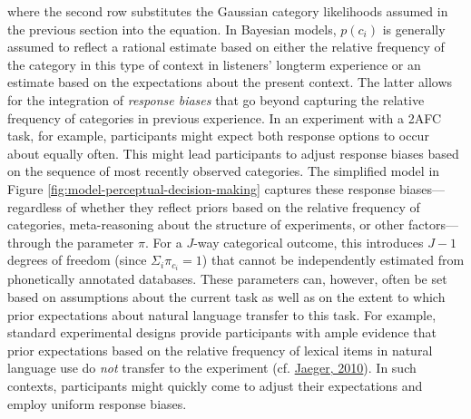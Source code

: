 \documentclass[
  11pt,
  man,floatsintext]{apa6}
\begin{document}
where the second row substitutes the Gaussian category likelihoods assumed in the previous section into the equation. In Bayesian models, \(p(c_i)\) is generally assumed to reflect a rational estimate based on either the relative frequency of the category in this type of context in listeners' longterm experience or an estimate based on the expectations about the present context. The latter allows for the integration of \emph{response biases} that go beyond capturing the relative frequency of categories in previous experience. In an experiment with a 2AFC task, for example, participants might expect both response options to occur about equally often. This might lead participants to adjust response biases based on the sequence of most recently observed categories. The simplified model in Figure \ref{fig:model-perceptual-decision-making} captures these response biases---regardless of whether they reflect priors based on the relative frequency of categories, meta-reasoning about the structure of experiments, or other factors---through the parameter \(\pi\).
For a \(J\)-way categorical outcome, this introduces \(J-1\) degrees of freedom (since \(\Sigma_i \pi_{c_i} = 1\)) that cannot be independently estimated from phonetically annotated databases. These parameters can, however, often be set based on assumptions about the current task as well as on the extent to which prior expectations about natural language transfer to this task. For example, standard experimental designs provide participants with ample evidence that prior expectations based on the relative frequency of lexical items in natural language use do \emph{not} transfer to the experiment (cf. \protect\hyperlink{ref-jaeger2010}{Jaeger, 2010}). In such contexts, participants might quickly come to adjust their expectations and employ uniform response biases.
\end{document}
